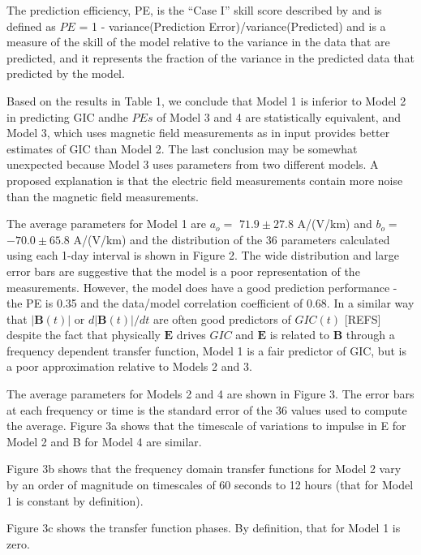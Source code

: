 \documentclass[draft,linenumbers]{agujournal2018}
\begin{document}
The prediction efficiency, PE, is the ``Case I'' skill score described by \cite{Murphy1988} and is defined as $PE$ = 1 - variance(Prediction Error)/variance(Predicted) and is a measure of the skill of the model relative to the variance in the data that are predicted, and it represents the fraction of the variance in the predicted data that predicted by the model.

Based on the results in Table 1, we conclude that Model 1 is inferior to Model 2 in predicting GIC andhe $PEs$ of Model 3 and 4 are statistically equivalent, and Model 3, which uses magnetic field measurements as in input provides better estimates of GIC than Model 2. The last conclusion may be somewhat unexpected because Model 3 uses parameters from two different models. A proposed explanation is that the electric field measurements contain more noise than the magnetic field measurements.

The average parameters for Model 1 are $a_o =$ $71.9 \pm 27.8$ A/(V/km) and $b_o =$ $-70.0 \pm 65.8$ A/(V/km) and the distribution of the 36 parameters calculated using each 1-day interval is shown in Figure 2. The wide distribution and large error bars are suggestive that the model is a poor representation of the measurements. However, the model does have a good prediction performance - the PE is 0.35 and the data/model correlation coefficient of 0.68. In a similar way that $|\mathbf{B}(t)|$ or $d|\mathbf{B}(t)|/dt$ are often good predictors of $GIC(t)$ [REFS] despite the fact that physically $\mathbf{E}$ drives $GIC$ and $\mathbf{E}$ is related to $\mathbf{B}$ through a frequency dependent transfer function, Model 1 is a fair predictor of GIC, but is a poor approximation relative to Models 2 and 3.

The average parameters for Models 2 and 4 are shown in Figure 3. The error bars at each frequency or time is the standard error of the 36 values used to compute the average. Figure 3a shows that the timescale of variations to impulse in E for Model 2 and B for Model 4 are similar.

Figure 3b shows that the frequency domain transfer functions for Model 2 vary by an order of magnitude on timescales of 60 seconds to 12 hours (that for Model 1 is constant by definition).

Figure 3c shows the transfer function phases. By definition, that for Model 1 is zero.



\end{document}
